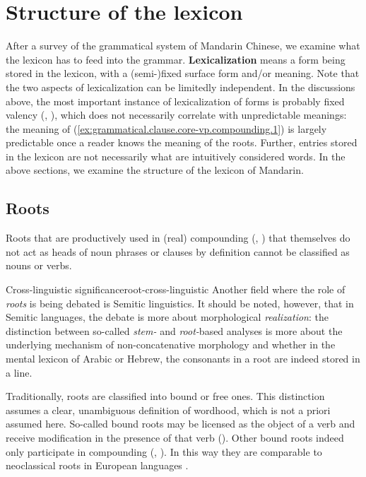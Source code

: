 \documentclass[UTF8, a4paper, oneside, scheme=plain, 12pt]{ctexrep}
\newcommand*{\concept}[1]{\textbf{#1}}
\newcommand*{\term}[1]{\emph{#1}}
\begin{document}
\section{Structure of the lexicon}\label{sec:grammatical.lexicon}

After a survey of the grammatical system of Mandarin Chinese,
we examine what the lexicon has to feed into the grammar.
\concept{Lexicalization} means a form being stored in the lexicon,
with a (semi-)fixed surface form and/or meaning.
Note that the two aspects of lexicalization can be limitedly independent.
In the discussions above, the most important instance of lexicalization of forms
is probably fixed valency
(, ),
which does not necessarily correlate with unpredictable meanings:
the meaning of (\ref{ex:grammatical.clause.core-vp.compounding.1}) is largely predictable
once a reader knows the meaning of the roots.
Further, entries stored in the lexicon are not necessarily what are intuitively considered words.
In the above sections, we examine the structure of the lexicon of Mandarin.

\subsection{Roots}\label{sec:grammatical.lexicon.roots}

Roots that are productively used in (real) compounding 
(,
)
that themselves do not act as heads of noun phrases or clauses
by definition cannot be classified as nouns or verbs.

\begin{infobox}{Cross-linguistic significance}{root-cross-linguistic}
    Another field where the role of \term{roots} is being debated is Semitic linguistics.
    It should be noted, however, that in Semitic languages,
    the debate is more about morphological \term{realization}:
    the distinction between so-called \term{stem-} and \term{root-}based analyses
    is more about the underlying mechanism of non-concatenative morphology
    and whether in the mental lexicon of Arabic or Hebrew,
    the consonants in a root are indeed stored in a line.
\end{infobox}

Traditionally, roots are classified into bound or free ones.
This distinction assumes a clear, unambiguous definition of wordhood,
which is not a priori assumed here.
So-called bound roots may be licensed as the object of a verb
and receive modification in the presence of that verb 
().
Other bound roots indeed only participate in compounding
(,
).
In this way they are comparable to neoclassical roots in European languages
\citep{di2005decomposing,scher2014unifying}.
\end{document}
